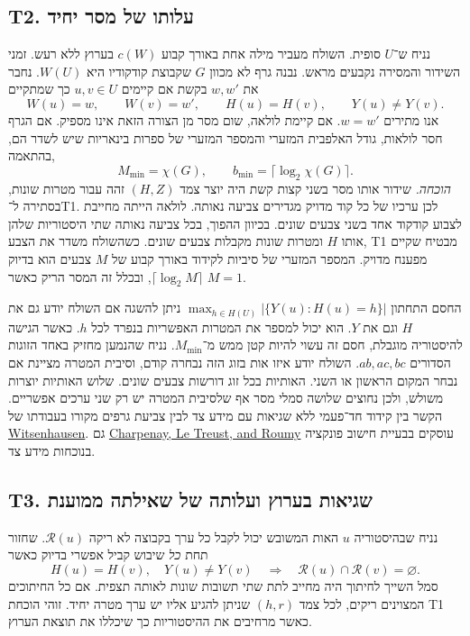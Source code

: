 \documentclass[11pt,a4paper]{article}
\DeclareRobustCommand{\textenglish}[1]{\foreignlanguage{english}{#1}}
\theoremstyle{definition}
\begin{document}
\subsection{\textenglish{T2}. עלותו של מסר יחיד}
\label{thm:observer-t2}

נניח ש־$U$ סופית. השולח מעביר מילה אחת באורך קבוע $c(W)$ בערוץ ללא רעש. זמני השידור והמסירה נקבעים מראש. נבנה גרף לא מכוון $G$ שקבוצת קודקודיו היא $W(U)$. נחבר את $w,w'$ בקשת אם קיימים $u,v\in U$ כך שמתקיים
\[
 W(u)=w,\qquad W(v)=w',\qquad H(u)=H(v),\qquad Y(u)\ne Y(v).
\]
אנו מתירים $w=w'$. אם קיימת לולאה, שום מסר מן הצורה הזאת אינו מספיק. אם הגרף חסר לולאות, גודל האלפבית המזערי והמספר המזערי של ספרות בינאריות שיש לשדר הם, בהתאמה,
\[
 M_{\min}=\chi(G),\qquad b_{\min}=\lceil\log_2\chi(G)\rceil .
\]
\emph{הוכחה.} שידור אותו מסר בשני קצות קשת היה יוצר צמד $(H,Z)$ זהה עבור מטרות שונות, בסתירה ל־\textenglish{T1}. לכן ערכיו של כל קוד מדויק מגדירים צביעה נאותה. לולאה הייתה מחייבת לצבוע קודקוד אחד בשני צבעים שונים. בכיוון ההפוך, בכל צביעה נאותה שתי היסטוריות שלהן אותו $H$ ומטרות שונות מקבלות צבעים שונים. כשהשולח משדר את הצבע, \textenglish{T1} מבטיח שקיים מפענח מדויק. המספר המזערי של סיביות לקידוד באורך קבוע של $M$ צבעים הוא בדיוק $\lceil\log_2 M\rceil$, ובכלל זה המסר הריק כאשר $M=1$.

החסם התחתון $\max_{h\in H(U)}|\{Y(u):H(u)=h\}|$ ניתן להשגה אם השולח יודע גם את $H$ וגם את $Y$. הוא יכול למספר את המטרות האפשריות בנפרד לכל $h$. כאשר הגישה להיסטוריה מוגבלת, חסם זה עשוי להיות קטן ממש מ־$M_{\min}$. נניח שהנמען מחזיק באחד הזוגות הסדורים $ab,ac,bc$. השולח יודע איזו אות בזוג הזה נבחרה קודם, וסיבית המטרה מציינת אם נבחר המקום הראשון או השני. האותיות בכל זוג דורשות צבעים שונים. שלוש האותיות יוצרות משולש, ולכן נחוצים שלושה סמלי מסר אף שלסיבית המטרה יש רק שני ערכים אפשריים. הקשר בין קידוד חד־פעמי ללא שגיאות עם מידע צד לבין צביעת גרפים מקורו בעבודתו של \href{https://doi.org/10.1109/TIT.1976.1055607}{\textenglish{Witsenhausen}}. גם \href{https://doi.org/10.3390/e26040338}{\textenglish{Charpenay, Le Treust, and Roumy}} עוסקים בבעיית חישוב פונקציה בנוכחות מידע צד.

\subsection{\textenglish{T3}. שגיאות בערוץ ועלותה של שאילתה ממוענת}
\label{thm:observer-t3}

נניח שבהיסטוריה $u$ האות המשובש יכול לקבל כל ערך בקבוצה לא ריקה $\mathcal R(u)$. שחזור תחת \emph{כל} שיבוש קביל אפשרי בדיוק כאשר
\[
 H(u)=H(v),\quad Y(u)\ne Y(v)
 \quad\Longrightarrow\quad \mathcal R(u)\cap\mathcal R(v)=\varnothing .
\]
סמל השייך לחיתוך היה מחייב לתת שתי תשובות שונות לאותה תצפית. אם כל החיתוכים המצוינים ריקים, לכל צמד $(h,r)$ שניתן להגיע אליו יש ערך מטרה יחיד. זוהי הוכחת \textenglish{T1} כאשר מרחיבים את ההיסטוריות כך שיכללו את תוצאת הערוץ.
\end{document}
